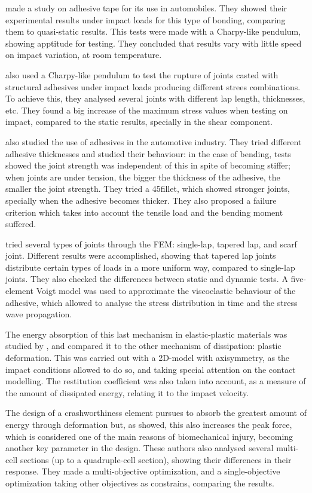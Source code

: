 \citet{Kadioglu2014} made a study on adhesive tape for its use in automobiles. They showed their experimental results under impact loads for this type of bonding, comparing them to quasi-static results. This tests were made with a Charpy-like pendulum, showing apptitude for testing. They concluded that results vary with little speed on impact variation, at room temperature.

\citet{Goglio2008} also used a Charpy-like pendulum to test the rupture of joints casted with structural adhesives under impact loads producing different strees combinations. To achieve this, they analysed several joints with different lap length, thicknesses, etc. They found a big increase of the maximum stress values when testing on impact, compared to the static results, specially in the shear component.

\citet{Grant2009} also studied the use of adhesives in the automotive industry. They tried different adhesive thicknesses and studied their behaviour: in the case of bending, tests showed the joint strength was independent of this in spite of becoming stiffer; when joints are under tension, the bigger the thickness of the adhesive, the smaller the joint strength. They tried a 45\degree fillet, which showed stronger joints, specially when the adhesive becomes thicker. They also proposed a failure criterion which takes into account the tensile load and the bending moment suffered.

\citet{Sato2000} tried several types of joints through the FEM: single-lap, tapered lap, and scarf joint. Different results were accomplished, showing that tapered lap joints distribute certain types of loads in a more uniform way, compared to single-lap joints. They also checked the differences between static and dynamic tests. A five-element Voigt model was used to approximate the viscoelastic behaviour of the adhesive, which allowed to analyse the stress distribution in time and the stress wave propagation.

The energy absorption of this last mechanism in elastic-plastic materials was studied by \citet{Wu2006}, and compared it to the other mechanism of dissipation: plastic deformation. This was carried out with a 2D-model with axisymmetry, as the impact conditions allowed to do so, and taking special attention on the contact modelling. The restitution coefficient was also taken into account, as a measure of the amount of dissipated energy, relating it to the impact velocity.

The design of a crashworthiness element pursues to absorb the greatest amount of energy through deformation but, as \citet{Hou2008} showed, this also increases the peak force, which is considered one of the main reasons of biomechanical injury, becoming another key parameter in the design. These authors also analysed several multi-cell sections (up to a quadruple-cell section), showing their differences in their response. They made a multi-objective optimization, and a single-objective optimization taking other objectives as constrains, comparing the results.

